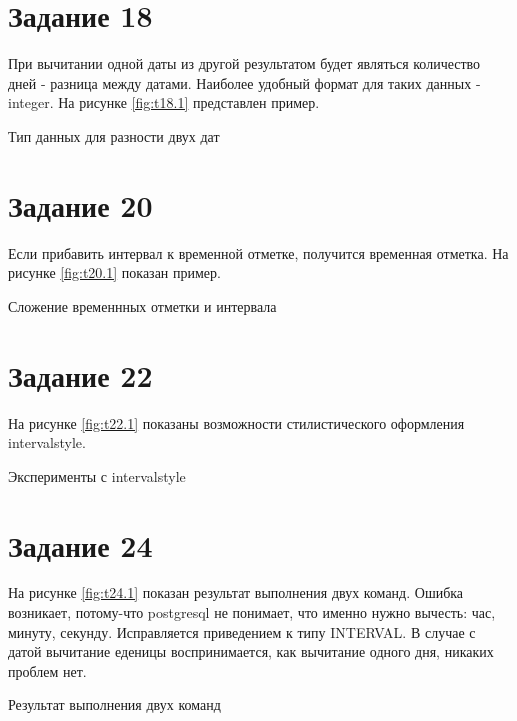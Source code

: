 \section{Задание 18}

При вычитании одной даты из другой результатом будет являться количество дней - разница между датами. Наиболее удобный формат для таких данных - integer. На рисунке \ref{fig:t18.1} представлен пример.

\begin{myfigure}{18.1}
  \caption{Тип данных для разности двух дат}
  \label{fig:t18.1}
\end{myfigure}

\section{Задание 20}

Если прибавить интервал к временной отметке, получится временная отметка. На рисунке \ref{fig:t20.1} показан пример.

\begin{myfigure}{20.1}
  \caption{Сложение временнных отметки и интервала}
  \label{fig:t20.1}
\end{myfigure}

\section{Задание 22}

На рисунке \ref{fig:t22.1} показаны возможности стилистического оформления intervalstyle.

\begin{myfigure}{22.1}
  \caption{Эксперименты с intervalstyle}
  \label{fig:t22.1}
\end{myfigure}

\section{Задание 24}

На рисунке \ref{fig:t24.1} показан результат выполнения двух команд. Ошибка возникает, потому-что postgresql не понимает, что именно нужно вычесть: час, минуту, секунду. Исправляется приведением к типу INTERVAL. В случае с датой вычитание еденицы воспринимается, как вычитание одного дня, никаких проблем нет.

\begin{myfigure}{24.1}
  \caption{Результат выполнения двух команд}
  \label{fig:t24.1}
\end{myfigure}

